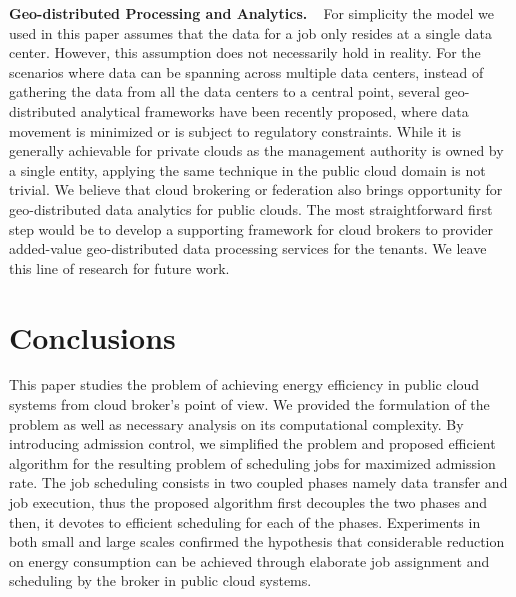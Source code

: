 \documentclass{article}
\newcommand{\bpara}[2]{\noindent\textbf{#1~~}{#2}}
\begin{document}
\bpara{Geo-distributed Processing and Analytics.} For simplicity the model we used in this paper assumes that the data for a job only resides at a single data center. However, this assumption does not necessarily hold in reality. For the scenarios where data can be spanning across multiple data centers, instead of gathering the data from all the data centers to a central point, several geo-distributed analytical frameworks \cite{Pu-GEO-2015, Vulimiri-Iridium-2015} have been recently proposed, where data movement is minimized or is subject to regulatory constraints. While it is generally achievable for private clouds as the management authority is owned by a single entity, applying the same technique in the public cloud domain is not trivial. We believe that cloud brokering or federation also brings opportunity for geo-distributed data analytics for public clouds. The most straightforward first step would be to develop a supporting framework for cloud brokers to provider added-value geo-distributed data processing services for the tenants. We leave this line of research for future work.


\section{Conclusions}
\label{sec:conc}

This paper studies the problem of achieving energy efficiency in public cloud systems from cloud broker's point of view. We provided the formulation of the problem as well as necessary analysis on its computational complexity. By introducing admission control, we simplified the problem and proposed efficient algorithm for the resulting problem of scheduling jobs for maximized admission rate. The job scheduling consists in two coupled phases namely data transfer and job execution, thus the proposed algorithm first decouples the two phases and then, it devotes to efficient scheduling for each of the phases. Experiments in both small and large scales confirmed the hypothesis that considerable reduction on energy consumption can be achieved through elaborate job assignment and scheduling by the broker in public cloud systems.

























































  

\balance
\end{document}
